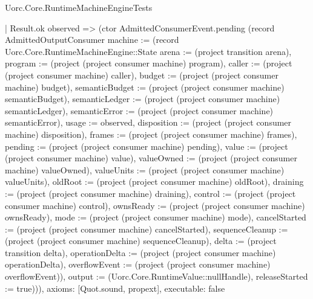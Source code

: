 \begin{lexlean}{Uorc.Core.RuntimeMachineEngineTests}
\begin{semanticmodule}
{    | Result.ok observed => (ctor AdmittedConsumerEvent.pending (record AdmittedOutputConsumer {machine := (record Uorc.Core.RuntimeMachineEngine::State {arena := (project transition arena), program := (project (project consumer machine) program), caller := (project (project consumer machine) caller), budget := (project (project consumer machine) budget), semanticBudget := (project (project consumer machine) semanticBudget), semanticLedger := (project (project consumer machine) semanticLedger), semanticError := (project (project consumer machine) semanticError), usage := observed, disposition := (project (project consumer machine) disposition), frames := (project (project consumer machine) frames), pending := (project (project consumer machine) pending), value := (project (project consumer machine) value), valueOwned := (project (project consumer machine) valueOwned), valueUnits := (project (project consumer machine) valueUnits), oldRoot := (project (project consumer machine) oldRoot), draining := (project (project consumer machine) draining), control := (project (project consumer machine) control), ownsReady := (project (project consumer machine) ownsReady), mode := (project (project consumer machine) mode), cancelStarted := (project (project consumer machine) cancelStarted), sequenceCleanup := (project (project consumer machine) sequenceCleanup), delta := (project transition delta), operationDelta := (project (project consumer machine) operationDelta), overflowEvent := (project (project consumer machine) overflowEvent)}), output := (Uorc.Core.RuntimeValue::nullHandle), releaseStarted := true}))),
  axioms: [Quot.sound, propext],
  executable: false
}


\end{semanticmodule}
\end{lexlean}
